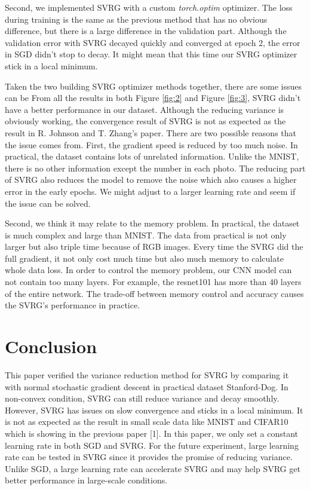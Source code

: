 \documentclass{article}
\begin{document}
Second, we implemented SVRG with a custom \emph{torch.optim} optimizer. The loss during training is the same as the previous method that has no obvious difference, but there is a large difference in the validation part. Although the validation error with SVRG decayed quickly and converged at epoch 2, the error in SGD didn't stop to decay. It might mean that this time our SVRG optimizer stick in a local minimum.

Taken the two building SVRG optimizer methods together, there are some issues can be
From all the results in both Figure \ref{fig:2} and Figure \ref{fig:3}, SVRG didn't have a better performance in our dataset. Although the reducing variance is obviously working, the convergence result of SVRG is not as expected as the result in R. Johnson and T. Zhang's paper. 
There are two possible reasons that the issue comes from. First, the gradient speed is reduced by too much noise. In practical, the dataset contains lots of unrelated information. Unlike the MNIST, there is no other information except the number in each photo. The reducing part of SVRG also reduces the model to remove the noise which also causes a higher error in the early epochs. We might adjust to a larger learning rate and seem if the issue can be solved.

Second, we think it may relate to the memory problem. In practical, the dataset is much complex and large than MNIST. The data from practical is not only larger but also triple time because of RGB images. Every time the SVRG did the full gradient, it not only cost much time but also much memory to calculate whole data loss. In order to control the memory problem, our CNN model can not contain too many layers. For example, the resnet101 has more than 40 layers of the entire network. The trade-off between memory control and accuracy causes the SVRG's performance in practice. 


\section{Conclusion}
This paper verified the variance reduction method for SVRG by comparing it with normal stochastic gradient descent in practical dataset Stanford-Dog. In non-convex condition, SVRG can still reduce variance and decay smoothly. However, SVRG has issues on slow convergence and sticks in a local minimum. It is not as expected as the result in small scale data like MNIST and CIFAR10 which is showing in the previous paper [1].
In this paper, we only set a constant learning rate in both SGD and SVRG. For the future experiment, large learning rate can be tested in SVRG since it provides the promise of reducing variance. Unlike SGD, a large learning rate can accelerate SVRG and may help SVRG get better performance in large-scale conditions.
\end{document}
